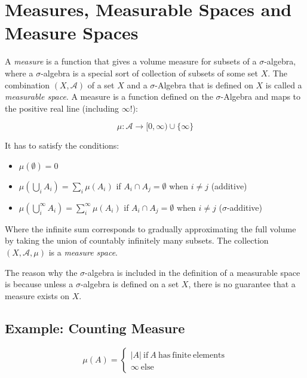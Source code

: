 \section{Measures, Measurable Spaces and Measure Spaces}
A \textit{measure} is a function that gives a volume measure for subsets of a $\sigma$-algebra, where a $\sigma$-algebra is a special sort of collection of subsets of some set $X$. 
The combination $(X,\mathscr{A})$ of a set $X$ and a $\sigma$-Algebra that is defined on $X$ is called a \textit{measurable space}. A measure is a function defined on the $\sigma$-Algebra and maps to the positive real line (including $\infty$!):

\begin{equation}
\mu: \mathscr{A} \rightarrow [0,\infty)\cup\{\infty\} 
\end{equation}

It has to satisfy the conditions:

\begin{itemize}
\item $\mu(\emptyset) = 0$
\item $\mu(\bigcup_i A_i) = \sum_i \mu(A_i)$ if $A_i \cap A_j = \emptyset$ when $i\neq j$ (additive)
\item $\mu(\bigcup^{\infty}_i A_i) = \sum^{\infty}_i \mu(A_i)$ if $A_i \cap A_j = \emptyset$ when $i\neq j$ ($\sigma$-additive) 
\end{itemize}

Where the infinite sum corresponds to gradually approximating the full volume by taking the union of countably infinitely many subsets. The collection $(X,\mathscr{A},\mu)$ is a \textit{measure space}. 

The reason why the $\sigma$-algebra is included in the definition of a measurable space is because unless a $\sigma$-algebra is defined on a set $X$, there is no guarantee that a measure exists on $X$.

\subsection{Example: Counting Measure}

\begin{equation}
\mu(A) = \left\{\begin{array}{l} |A| \mathrm{\ if\ }A\mathrm{\ has\ finite\ elements}\\ \infty\mathrm{\ else}\end{array}\right.
\end{equation}

